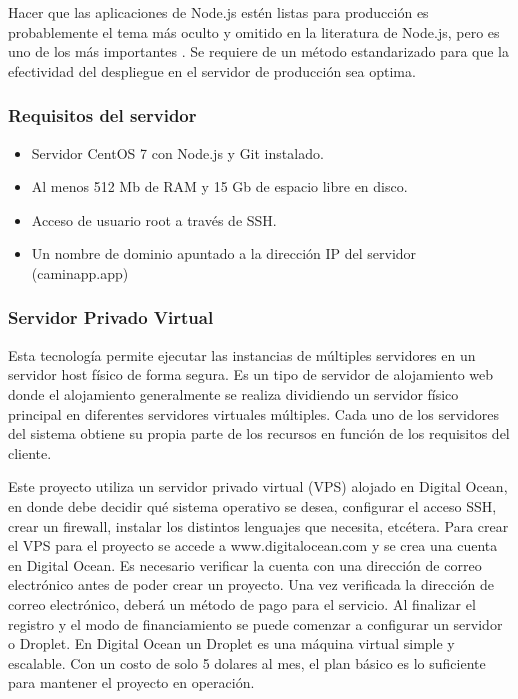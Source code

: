 Hacer que las aplicaciones de Node.js estén listas para producción es probablemente el tema más oculto y omitido en la literatura de Node.js, pero es uno de los más importantes \cite{mardan}. Se requiere de un método estandarizado para que la efectividad del despliegue en el servidor de producción sea optima.

\subsubsection{Requisitos del servidor}

\begin{itemize}
  \item Servidor CentOS 7 con Node.js y Git instalado.
  \item Al menos 512 Mb de RAM y 15 Gb de espacio libre en disco.
  \item Acceso de usuario root a través de SSH.
  \item Un nombre de dominio apuntado a la dirección IP del servidor (caminapp.app)
  
\end{itemize}

\subsubsection{Servidor Privado Virtual}
Esta tecnología permite ejecutar las instancias de múltiples servidores en un servidor host físico de forma segura. Es un tipo de servidor de alojamiento web donde el alojamiento generalmente se realiza dividiendo un servidor físico principal en diferentes servidores virtuales múltiples. Cada uno de los servidores del sistema obtiene su propia parte de los recursos en función de los requisitos del cliente.
\vspace{0.8cm}

Este proyecto utiliza un servidor privado virtual (VPS) alojado en Digital Ocean, en donde debe decidir qué sistema operativo se desea, configurar el acceso SSH, crear un firewall, instalar los distintos lenguajes que necesita, etcétera. Para crear el VPS para el proyecto se accede a www.digitalocean.com y se crea una cuenta en Digital Ocean. Es necesario verificar la cuenta con una dirección de correo electrónico antes de poder crear un proyecto. Una vez verificada la dirección de correo electrónico, deberá un método de pago para el servicio. Al finalizar el registro y el modo de financiamiento se puede comenzar a configurar un servidor o Droplet. En Digital Ocean un Droplet es una máquina virtual simple y escalable. Con un costo de solo 5 dolares al mes, el plan básico es lo suficiente para mantener el proyecto en operación.
\vspace{0.8cm}

